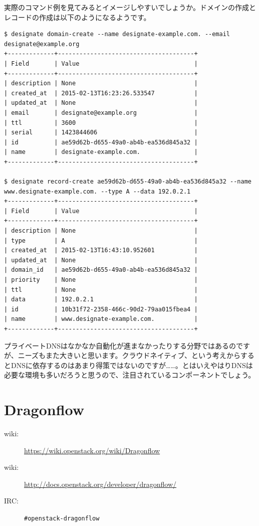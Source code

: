 実際のコマンド例を見てみるとイメージしやすいでしょうか。ドメインの作成とレコードの作成は以下のようになるようです。

\begin{lstlisting}
$ designate domain-create --name designate-example.com. --email designate@example.org
+-------------+--------------------------------------+
| Field       | Value                                |
+-------------+--------------------------------------+
| description | None                                 |
| created_at  | 2015-02-13T16:23:26.533547           |
| updated_at  | None                                 |
| email       | designate@example.org                |
| ttl         | 3600                                 |
| serial      | 1423844606                           |
| id          | ae59d62b-d655-49a0-ab4b-ea536d845a32 |
| name        | designate-example.com.               |
+-------------+--------------------------------------+

$ designate record-create ae59d62b-d655-49a0-ab4b-ea536d845a32 --name www.designate-example.com. --type A --data 192.0.2.1
+-------------+--------------------------------------+
| Field       | Value                                |
+-------------+--------------------------------------+
| description | None                                 |
| type        | A                                    |
| created_at  | 2015-02-13T16:43:10.952601           |
| updated_at  | None                                 |
| domain_id   | ae59d62b-d655-49a0-ab4b-ea536d845a32 |
| priority    | None                                 |
| ttl         | None                                 |
| data        | 192.0.2.1                            |
| id          | 10b31f72-2358-466c-90d2-79aa015fbea4 |
| name        | www.designate-example.com.           |
+-------------+--------------------------------------+
\end{lstlisting}

プライベートDNSはなかなか自動化が進まなかったりする分野ではあるのですが、ニーズもまた大きいと思います。クラウドネイティブ、という考えからするとDNSに依存するのはあまり得策ではないのですが……。とはいえやはりDNSは必要な環境も多いだろうと思うので、注目されているコンポーネントでしょう。

\section{Dragonflow}

\begin{description}
	\item[wiki:] \url{https://wiki.openstack.org/wiki/Dragonflow}
	\item[wiki:] \url{http://docs.openstack.org/developer/dragonflow/}
	\item[IRC:] \verb|#openstack-dragonflow|
\end{description}

